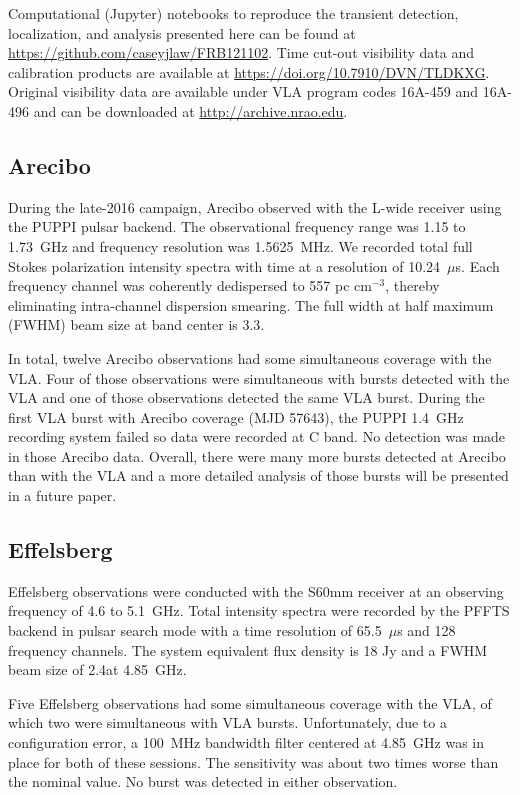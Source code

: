 \documentclass[twocolumn]{aastex61}
\begin{document}
Computational (Jupyter) notebooks to reproduce the transient detection, localization, and analysis presented here can be found at \url{https://github.com/caseyjlaw/FRB121102}. Time cut-out visibility data and calibration products are available at \url{https://doi.org/10.7910/DVN/TLDKXG}. Original visibility data are available under VLA program codes 16A-459 and 16A-496 and can be downloaded at \url{http://archive.nrao.edu}.

\subsection{Arecibo}

During the late-2016 campaign, Arecibo observed with the L-wide receiver using the PUPPI pulsar backend. The observational frequency range was 1.15 to 1.73~GHz and frequency resolution was 1.5625~MHz. We recorded total full Stokes polarization intensity spectra with time at a resolution of 10.24~$\mu$s. Each frequency channel was coherently dedispersed to 557 pc cm$^{-3}$, thereby eliminating intra-channel dispersion smearing. The full width at half maximum (FWHM) beam size at band center is 3.3\arcmin.

In total, twelve Arecibo observations had some simultaneous coverage with the VLA. Four of those observations were simultaneous with bursts detected with the VLA and one of those observations detected the same VLA burst. During the first VLA burst with Arecibo coverage (MJD 57643), the PUPPI 1.4~GHz recording system failed so data were recorded at C band. No detection was made in those Arecibo data. Overall, there were many more bursts detected at Arecibo than with the VLA and a more detailed analysis of those bursts will be presented in a future paper.

\subsection{Effelsberg}

Effelsberg observations were conducted with the S60mm receiver at an observing frequency of 4.6 to 5.1~GHz. Total intensity spectra were recorded by the PFFTS backend in pulsar search mode with a time resolution of 65.5~$\mu$s and 128 frequency channels. The system equivalent flux density is 18 Jy and a FWHM beam size of 2.4\arcmin at 4.85~GHz. 

Five Effelsberg observations had some simultaneous coverage with the VLA, of which two were simultaneous with VLA bursts. Unfortunately, due to a configuration error, a 100~MHz bandwidth filter centered at 4.85~GHz was in place for both of these sessions. The sensitivity was about two times worse than the nominal value. No burst was detected in either observation.
\end{document}

